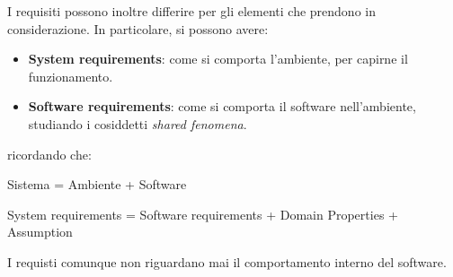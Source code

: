 I requisiti possono inoltre differire per gli elementi che prendono in considerazione.
In particolare, si possono avere:
\begin{itemize}
      \item \textbf{System requirements}: come si comporta l'ambiente, per capirne
            il funzionamento.
      \item \textbf{Software requirements}: come si comporta il software
            nell'ambiente, studiando i cosiddetti \textit{shared fenomena}.
\end{itemize}
ricordando che:
\begin{center}
      Sistema = Ambiente + Software
\end{center}
\begin{center}
      System requirements = Software requirements + Domain Properties + Assumption
\end{center}
I requisti comunque non riguardano mai il comportamento interno del software.

